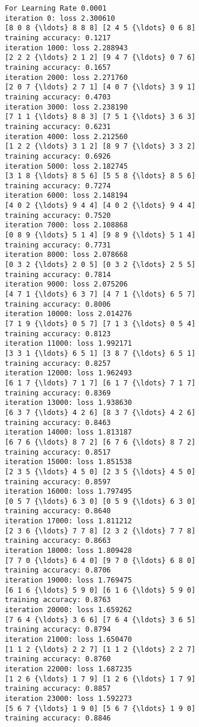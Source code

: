 \documentclass[11pt]{article}
\begin{document}
    \begin{Verbatim}[commandchars=\\\{\}]
For Learning Rate 0.0001
iteration 0: loss 2.300610
[8 0 8 {\ldots} 8 8 8] [2 4 5 {\ldots} 0 6 8]
training accuracy: 0.1217
iteration 1000: loss 2.288943
[2 2 2 {\ldots} 2 1 2] [9 4 7 {\ldots} 0 7 6]
training accuracy: 0.1657
iteration 2000: loss 2.271760
[2 0 7 {\ldots} 2 7 1] [4 0 7 {\ldots} 3 9 1]
training accuracy: 0.4703
iteration 3000: loss 2.238190
[7 1 1 {\ldots} 8 8 3] [7 5 1 {\ldots} 3 6 3]
training accuracy: 0.6231
iteration 4000: loss 2.212560
[1 2 2 {\ldots} 3 1 2] [8 9 7 {\ldots} 3 3 2]
training accuracy: 0.6926
iteration 5000: loss 2.182745
[3 1 8 {\ldots} 8 5 6] [5 5 8 {\ldots} 8 5 6]
training accuracy: 0.7274
iteration 6000: loss 2.148194
[4 0 2 {\ldots} 9 4 4] [4 0 2 {\ldots} 9 4 4]
training accuracy: 0.7520
iteration 7000: loss 2.108868
[0 8 9 {\ldots} 5 1 4] [9 8 9 {\ldots} 5 1 4]
training accuracy: 0.7731
iteration 8000: loss 2.078668
[0 3 2 {\ldots} 2 0 5] [0 3 2 {\ldots} 2 5 5]
training accuracy: 0.7814
iteration 9000: loss 2.075206
[4 7 1 {\ldots} 6 3 7] [4 7 1 {\ldots} 6 5 7]
training accuracy: 0.8006
iteration 10000: loss 2.014276
[7 1 9 {\ldots} 0 5 7] [7 1 3 {\ldots} 0 5 4]
training accuracy: 0.8123
iteration 11000: loss 1.992171
[3 3 1 {\ldots} 6 5 1] [3 8 7 {\ldots} 6 5 1]
training accuracy: 0.8257
iteration 12000: loss 1.962493
[6 1 7 {\ldots} 7 1 7] [6 1 7 {\ldots} 7 1 7]
training accuracy: 0.8369
iteration 13000: loss 1.938630
[6 3 7 {\ldots} 4 2 6] [8 3 7 {\ldots} 4 2 6]
training accuracy: 0.8463
iteration 14000: loss 1.813187
[6 7 6 {\ldots} 8 7 2] [6 7 6 {\ldots} 8 7 2]
training accuracy: 0.8517
iteration 15000: loss 1.851538
[2 3 5 {\ldots} 4 5 0] [2 3 5 {\ldots} 4 5 0]
training accuracy: 0.8597
iteration 16000: loss 1.797495
[0 5 7 {\ldots} 6 3 0] [0 5 9 {\ldots} 6 3 0]
training accuracy: 0.8640
iteration 17000: loss 1.811212
[2 3 6 {\ldots} 7 7 8] [2 3 2 {\ldots} 7 7 8]
training accuracy: 0.8663
iteration 18000: loss 1.809428
[7 7 0 {\ldots} 6 4 0] [9 7 0 {\ldots} 6 8 0]
training accuracy: 0.8706
iteration 19000: loss 1.769475
[6 1 6 {\ldots} 5 9 0] [6 1 6 {\ldots} 5 9 0]
training accuracy: 0.8763
iteration 20000: loss 1.659262
[7 6 4 {\ldots} 3 6 6] [7 6 4 {\ldots} 3 6 5]
training accuracy: 0.8794
iteration 21000: loss 1.650470
[1 1 2 {\ldots} 2 2 7] [1 1 2 {\ldots} 2 2 7]
training accuracy: 0.8760
iteration 22000: loss 1.687235
[1 2 6 {\ldots} 1 7 9] [1 2 6 {\ldots} 1 7 9]
training accuracy: 0.8857
iteration 23000: loss 1.592273
[5 6 7 {\ldots} 1 9 0] [5 6 7 {\ldots} 1 9 0]
training accuracy: 0.8846

\end{Verbatim}
\end{document}
